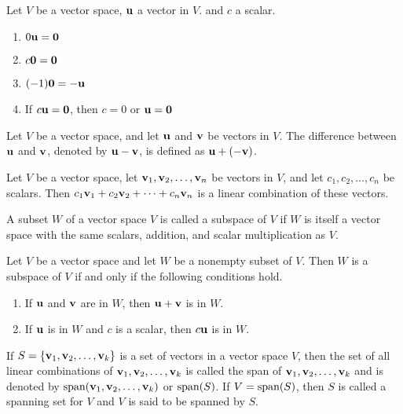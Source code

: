 \documentclass[../m73main.tex]{subfiles}
\begin{document}
\begin{theorem}
	Let $V$ be a vector space, $\mathbf{u}$ a vector in $V$. and $c$ a scalar.
	\begin{enumerate}[label=(\alph*)]
		\item $0 \mathbf{u} = \mathbf{0}$
		\item $c \mathbf{0} = \mathbf{0}$
		\item $(-1) \mathbf{0} = -\mathbf{u}$
		\item If $c \mathbf{u} = \mathbf{0}$, then $c = 0$ or $\mathbf{u} = \mathbf{0}$
	\end{enumerate}
\end{theorem}

\begin{definition}
	Let $V$ be a vector space, and let $\mathbf{u}$ and $\mathbf{v}$ be vectors in $V$.
	The difference between $\mathbf{u}$ and $\mathbf{v}$, denoted by $\mathbf{u} - \mathbf{v}$, is defined as $\mathbf{u} + (-\mathbf{v})$.
\end{definition}

\begin{definition}
	Let $V$ be a vector space, let $\mathbf{v}_1, \mathbf{v}_2, \ldots, \mathbf{v}_n$ be vectors in $V$, and let $c_1, c_2, \ldots, c_n$ be scalars.
	Then $c_1\mathbf{v}_1 + c_2\mathbf{v}_2 + \cdots + c_n \mathbf{v}_n$ is a linear combination of these vectors.
\end{definition}

\begin{definition}[Subspace]
	A subset $W$ of a vector space $V$ is called a subspace of $V$ if $W$ is itself a vector space with the same scalars, addition, and scalar multiplication as $V$.
\end{definition}

\begin{theorem}
	Let $V$ be a vector space and let $W$ be a nonempty subset of $V$.
	Then $W$ is a subspace of $V$ if and only if the following conditions hold.
	\begin{enumerate}[label=(\alph*)]
		\item If $\mathbf{u}$ and $\mathbf{v}$ are in $W$, then $\mathbf{u} + \mathbf{v}$ is in $W$.
		\item If $\mathbf{u}$ is in $W$ and $c$ is a scalar, then $c \mathbf{u}$ is in $W$.
	\end{enumerate}
\end{theorem}

\begin{definition}[Span]
	If $S = \{\mathbf{v}_1, \mathbf{v}_2, \ldots, \mathbf{v}_{k}\}$ is a set of vectors in a vector space $V$, then the set of all linear combinations of $\mathbf{v}_1, \mathbf{v}_2, \ldots, \mathbf{v}_k$ is called the span of $\mathbf{v}_1, \mathbf{v}_2, \ldots, \mathbf{v}_k$ and is denoted by $\textrm{span}(\mathbf{v}_1, \mathbf{v}_2, \ldots, \mathbf{v}_k)$ or $\textrm{span}(S)$.
	If $V = \textrm{span}(S)$, then $S$ is called a spanning set for $V$ and $V$ is said to be spanned by $S$.
\end{definition}
\end{document}
